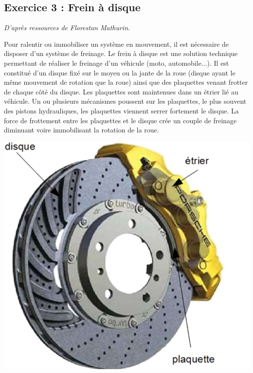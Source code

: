\documentclass[10pt]{article}
\begin{document}

\subsection*{Exercice 3 : Frein à disque}
\setcounter{subparagraph}{0}
\begin{flushright}
\textit{D'après ressources de Florestan Mathurin.}
\end{flushright}
\begin{minipage}[c]{.6\linewidth}
Pour ralentir ou immobiliser un système en mouvement, il est nécessaire de disposer d'un système de freinage. Le frein à disque est une solution technique permettant de réaliser le freinage d'un véhicule (moto, automobile...). Il est constitué d'un disque fixé sur le moyeu ou la jante de la roue (disque ayant le même mouvement de rotation que la roue) ainsi que des plaquettes venant frotter de chaque côté du disque. Les plaquettes sont maintenues dans un étrier lié au véhicule. Un ou plusieurs mécanismes poussent sur les plaquettes, le plus souvent des pistons hydrauliques, les plaquettes viennent serrer fortement le disque. La force de frottement entre les plaquettes et le disque crée un couple de freinage diminuant voire immobilisant la rotation de la roue. 
\end{minipage} \hfill
\begin{minipage}[c]{.35\linewidth}
\begin{center}
\includegraphics[width=\textwidth]{images/frein1}
\end{center}
\end{minipage}
\end{document}

